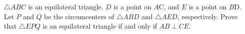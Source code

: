
$\triangle ABC$ is an equilateral triangle. $D$ is a point on $A$C, and $E$ is a point on $B$D. Let $P$ and $Q$ be the circumcenters of $\triangle ABD$ and $\triangle AED$, respectively. Prove that $\triangle EPQ$ is an equilateral triangle if and only if $AB \perp CE$.

